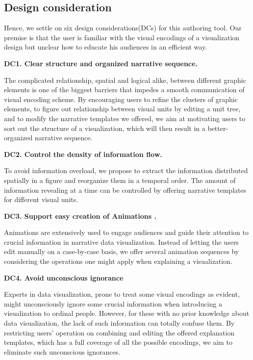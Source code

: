 \documentclass[review,journal]{vgtc}         %
\begin{document}
\subsection{Design consideration}
Hence, we settle on six design considerations(DCs) for this authoring tool. Our premise is that the user is familiar with the visual encodings of a visualization design but unclear how to educate his audiences in an efficient way. \par
\textbf{DC1. Clear structure and organized narrative sequence.}\par
The complicated relationship, spatial and logical alike,  between different graphic elements is one of the biggest barriers that impedes a smooth communication of visual encoding scheme. By encouraging users to refine the clusters of graphic elements, to figure out relationship between visual units by editing a unit tree, and to modify the narrative templates we offered, we aim at motivating users to sort out the structure of a visualization, which will then result in a better-organized narrative sequence. \par
\textbf{DC2. Control the density of information flow.} \par
To avoid information overload, we propose to extract the information distributed spatially in a  figure and reorganize them in a temporal order. The amount of information revealing at a time can be controlled by offering narrative templates for different visual units. \par
\textbf{DC3. Support easy creation of Animations .}\par
Animations are extensively used to engage audiences and guide their attention to crucial information in narrative data visualization. Instead of letting the users edit manually on a case-by-case basis, we offer several animation sequences by considering the operations one might apply when explaining a visualization.\par
\textbf{DC4. Avoid unconscious ignorance}\par
Experts in data visualization, prone to treat some visual encodings as evident, might unconsciously ignore some crucial information when introducing a visualization to ordinal people. However, for these with no prior knowledge about data visualization, the lack of such information can totally confuse them. By restricting users' operation on combining and editing the offered explanation templates, which has a full coverage of all the possible encodings, we aim to eliminate such unconscious ignorances.   \par
\end{document}

